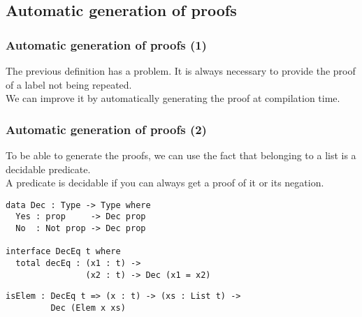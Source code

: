 \documentclass{beamer}
\begin{document}
\subsection{Automatic generation of proofs}

\begin{frame}[fragile]
\frametitle{Automatic generation of proofs (1)}

The previous definition has a problem. It is always necessary to provide the proof of a label not being repeated. \\

We can improve it by automatically generating the proof at compilation time.

\end{frame}

\begin{frame}[fragile]
\frametitle{Automatic generation of proofs (2)}

To be able to generate the proofs, we can use the fact that belonging to a list is a decidable predicate. \\

A predicate is decidable if you can always get a proof of it or its negation.

\pause

\begin{definition}
\begin{verbatim}
data Dec : Type -> Type where
  Yes : prop     -> Dec prop
  No  : Not prop -> Dec prop

interface DecEq t where
  total decEq : (x1 : t) -> 
                (x2 : t) -> Dec (x1 = x2)
\end{verbatim}
\end{definition}

\pause

\begin{definition}
\begin{verbatim}
isElem : DecEq t => (x : t) -> (xs : List t) -> 
         Dec (Elem x xs)
\end{verbatim}
\end{definition}

\end{frame}
\end{document}
